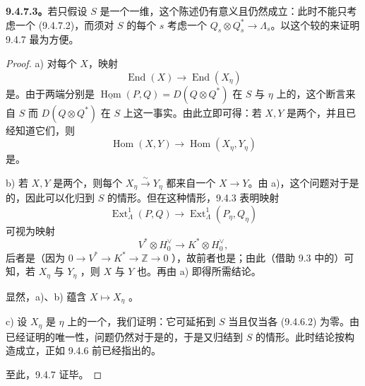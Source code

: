 \textbf{9.4.7.3。}若只假设 $S$ 是一个一维，这个陈述仍有意义且仍然成立：此时不能只考虑一个 (9.4.7.2)，而须对 $S$ 的每个 $s$ 考虑一个 $Q_s\otimes Q_s^*\to\Lambda_s$。以这个较的来证明 9.4.7 最为方便。
\begin{proof}
 a) 对每个 $X$，映射
\[
 \operatorname{End}(X)\longrightarrow\operatorname{End}(X_\eta)
\]
是。由于两端分别是 $\underline{\operatorname{Hom}}(P,Q)=D(Q\otimes Q^*)$ 在 $S$ 与 $\eta$ 上的，这个断言来自 $S$ 而 $D(Q\otimes Q^*)$ 在 $S$ 上这一事实。由此立即可得：若 $X,Y$ 是两个，并且已经知道它们，则
\[
 \operatorname{Hom}(X,Y)\longrightarrow\operatorname{Hom}(X_\eta,Y_\eta)
\]
是。

 b) 若 $X,Y$ 是两个，则每个 $X_\eta\xrightarrow{\sim}Y_\eta$ 都来自一个 $X\to Y$。由 a)，这个问题对于是的，因此可以化归到 $S$ 的情形。但在这种情形，9.4.3 表明映射
\[
 \operatorname{Ext}^1_\Lambda(P,Q)\longrightarrow\operatorname{Ext}^1_\Lambda(P_\eta,Q_\eta)
\]
可视为映射
\[
 V^*\otimes H_0^\vee\longrightarrow K^*\otimes H_0^\vee,
\]
后者是（因为 $0\to V^*\to K^*\to\mathbb Z\to0$ ），故前者也是；由此（借助 9.3 中的）可知，若 $X_\eta$ 与 $Y_\eta$ ，则 $X$ 与 $Y$ 也。再由 a) 即得所需结论。

显然，a)、b) 蕴含 $X\mapsto X_\eta$ 。

 c) 设 $X_\eta$ 是 $\eta$ 上的一个，我们证明：它可延拓到 $S$ 当且仅当各 (9.4.6.2) 为零。由已经证明的唯一性，问题仍然对于是的，于是又归结到 $S$ 的情形。此时结论按构造成立，正如 9.4.6 前已经指出的。

至此，9.4.7 证毕。
\end{proof}

